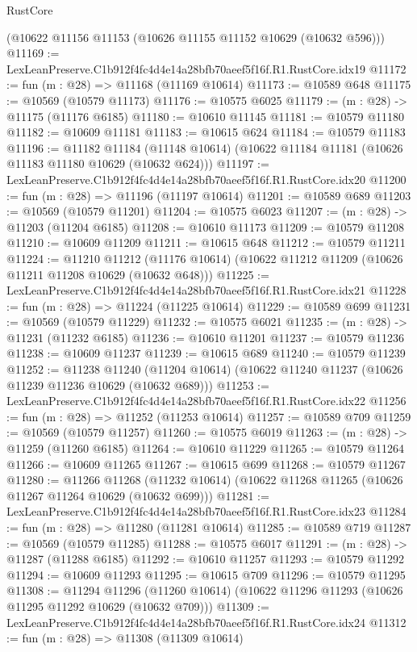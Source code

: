 \begin{lexlean}{RustCore}
\begin{coremodule}
    (@10622 @11156 @11153 (@10626 @11155 @11152 @10629 (@10632 @596)))
@11169 := LexLeanPreserve.C1b912f4fc4d4e14a28bfb70aeef5f16f.R1.RustCore.idx19
@11172 := fun (m : @28) => @11168 (@11169 @10614)
@11173 := @10589 @648
@11175 := @10569 (@10579 @11173)
@11176 := @10575 @6025
@11179 := (m : @28) -> @11175 (@11176 @6185)
@11180 := @10610 @11145
@11181 := @10579 @11180
@11182 := @10609 @11181
@11183 := @10615 @624
@11184 := @10579 @11183
@11196 := @11182
    @11184
    (@11148 @10614)
    (@10622 @11184 @11181 (@10626 @11183 @11180 @10629 (@10632 @624)))
@11197 := LexLeanPreserve.C1b912f4fc4d4e14a28bfb70aeef5f16f.R1.RustCore.idx20
@11200 := fun (m : @28) => @11196 (@11197 @10614)
@11201 := @10589 @689
@11203 := @10569 (@10579 @11201)
@11204 := @10575 @6023
@11207 := (m : @28) -> @11203 (@11204 @6185)
@11208 := @10610 @11173
@11209 := @10579 @11208
@11210 := @10609 @11209
@11211 := @10615 @648
@11212 := @10579 @11211
@11224 := @11210
    @11212
    (@11176 @10614)
    (@10622 @11212 @11209 (@10626 @11211 @11208 @10629 (@10632 @648)))
@11225 := LexLeanPreserve.C1b912f4fc4d4e14a28bfb70aeef5f16f.R1.RustCore.idx21
@11228 := fun (m : @28) => @11224 (@11225 @10614)
@11229 := @10589 @699
@11231 := @10569 (@10579 @11229)
@11232 := @10575 @6021
@11235 := (m : @28) -> @11231 (@11232 @6185)
@11236 := @10610 @11201
@11237 := @10579 @11236
@11238 := @10609 @11237
@11239 := @10615 @689
@11240 := @10579 @11239
@11252 := @11238
    @11240
    (@11204 @10614)
    (@10622 @11240 @11237 (@10626 @11239 @11236 @10629 (@10632 @689)))
@11253 := LexLeanPreserve.C1b912f4fc4d4e14a28bfb70aeef5f16f.R1.RustCore.idx22
@11256 := fun (m : @28) => @11252 (@11253 @10614)
@11257 := @10589 @709
@11259 := @10569 (@10579 @11257)
@11260 := @10575 @6019
@11263 := (m : @28) -> @11259 (@11260 @6185)
@11264 := @10610 @11229
@11265 := @10579 @11264
@11266 := @10609 @11265
@11267 := @10615 @699
@11268 := @10579 @11267
@11280 := @11266
    @11268
    (@11232 @10614)
    (@10622 @11268 @11265 (@10626 @11267 @11264 @10629 (@10632 @699)))
@11281 := LexLeanPreserve.C1b912f4fc4d4e14a28bfb70aeef5f16f.R1.RustCore.idx23
@11284 := fun (m : @28) => @11280 (@11281 @10614)
@11285 := @10589 @719
@11287 := @10569 (@10579 @11285)
@11288 := @10575 @6017
@11291 := (m : @28) -> @11287 (@11288 @6185)
@11292 := @10610 @11257
@11293 := @10579 @11292
@11294 := @10609 @11293
@11295 := @10615 @709
@11296 := @10579 @11295
@11308 := @11294
    @11296
    (@11260 @10614)
    (@10622 @11296 @11293 (@10626 @11295 @11292 @10629 (@10632 @709)))
@11309 := LexLeanPreserve.C1b912f4fc4d4e14a28bfb70aeef5f16f.R1.RustCore.idx24
@11312 := fun (m : @28) => @11308 (@11309 @10614)

\end{coremodule}
\end{lexlean}
